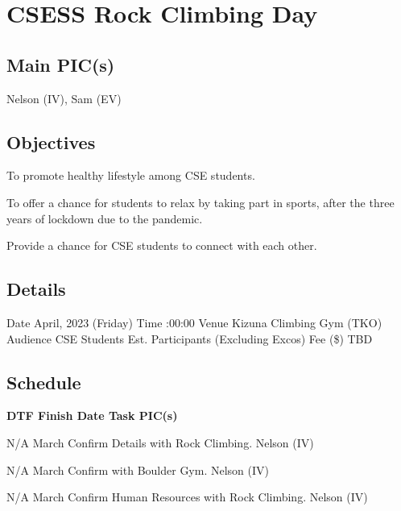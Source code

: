 \section{CSESS Rock Climbing Day}

\subsection{Main PIC(s)}
Nelson (IV), Sam (EV)

\subsection{Objectives}
\startitemize
\item To promote healthy lifestyle among CSE students.
\item To offer a chance for students to relax by taking part in sports, after the three years of lockdown due to the pandemic.
\item Provide a chance for CSE students to connect with each other.
\stopitemize

\subsection{Details}
\starttabulate[|rB|l|]
\NC Date
 April, 2023 (Friday) \NR
\NC Time
:00:00 \NR
\NC Venue
\NC Kizuna Climbing Gym (TKO) \NR
\NC Audience
\NC CSE Students \NR
\NC Est. Participants
 (Excluding Excos) \NR
\NC Fee (\$)
\NC TBD \NR
\stoptabulate

\subsection{Schedule}

\setupTABLE[c][1][width=0.75in]
\setupTABLE[c][2][width=1in]
\setupTABLE[c][3][width=3in]
\setupTABLE[c][4][width=1.25in]
\bTABLE
\bTABLEhead

\bTR\bTH    \bf{DTF}
\eTH\bTH    \bf{Finish Date}
\eTH\bTH    \bf{Task}
\eTH\bTH    \bf{PIC(s)}
\eTH\eTR

\eTABLEhead
\bTABLEbody

\bTR\bTD N/A
\eTD{} March
\eTD\bTD Confirm Details with Rock Climbing.
\eTD\bTD Nelson (IV)
\eTD\eTR

\bTR\bTD N/A
\eTD{} March
\eTD\bTD Confirm with Boulder Gym.
\eTD\bTD Nelson (IV)
\eTD\eTR

\bTR\bTD N/A
\eTD{} March
\eTD\bTD Confirm Human Resources with Rock Climbing.
\eTD\bTD Nelson (IV)
\eTD\eTR

